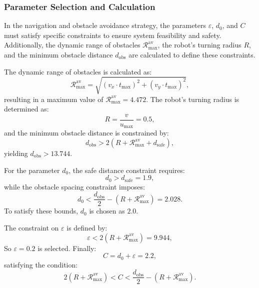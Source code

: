 \subsubsection*{Parameter Selection and Calculation}

In the navigation and obstacle avoidance strategy, the parameters \(\varepsilon\), \(d_0\), and \(C\) must satisfy specific constraints to ensure system feasibility and safety. Additionally, the dynamic range of obstacles \(\mathcal{R}_{\text{max}}^{\text{av}}\), the robot’s turning radius \(R\), and the minimum obstacle distance \(d_{\text{obs}}\) are calculated to define these constraints. 

The dynamic range of obstacles is calculated as:
\begin{equation}
\mathcal{R}_{\text{max}}^{\text{av}} = \sqrt{(v_x \cdot t_{\text{max}})^2 + (v_y \cdot t_{\text{max}})^2},
\end{equation}
resulting in a maximum value of \(\mathcal{R}_{\text{max}}^{\text{av}} = 4.472\). The robot’s turning radius is determined as:
\begin{equation}
R = \frac{v}{u_{\text{max}}} = 0.5,
\end{equation}
and the minimum obstacle distance is constrained by:
\begin{equation}
d_{\text{obs}} > 2(R + \mathcal{R}_{\text{max}}^{\text{av}} + d_{\text{safe}}),
\end{equation}
yielding \(d_{\text{obs}} > 13.744\). 

For the parameter \(d_0\), the safe distance constraint requires:
\begin{equation}
d_0 > d_{\text{safe}} = 1.9,
\end{equation}
while the obstacle spacing constraint imposes:
\begin{equation}
d_0 < \frac{d_{\text{obs}}}{2} - (R + \mathcal{R}_{\text{max}}^{\text{av}}) = 2.028.
\end{equation}
To satisfy these bounds, \(d_0\) is chosen as \(2.0\). 

The constraint on \(\varepsilon\) is defined by:
\begin{equation}
\varepsilon < 2(R + \mathcal{R}_{\text{max}}^{\text{av}}) = 9.944,
\end{equation}
So \(\varepsilon = 0.2\) is selected. Finally:
\begin{equation}
C = d_0 + \varepsilon = 2.2,
\end{equation}
satisfying the condition:
\begin{equation}
2(R + \mathcal{R}_{\text{max}}^{\text{av}}) < C < \frac{d_{\text{obs}}}{2} - (R + \mathcal{R}_{\text{max}}^{\text{av}}).
\end{equation}


